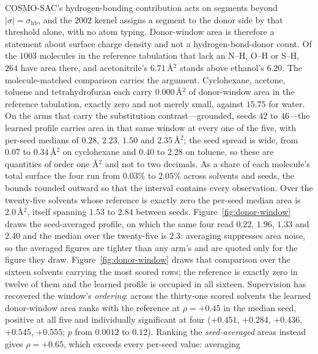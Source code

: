 COSMO-SAC's hydrogen-bonding contribution acts on segments beyond $|\sigma|=\sigma_{\mathrm{hb}}$,
and the $2002$ kernel assigns a segment to the donor side by that threshold alone, with no atom
typing. Donor-window area is therefore a statement about surface charge density and not a
hydrogen-bond-donor count. Of the $1003$ molecules in the reference tabulation that lack an N--H,
O--H or S--H, $264$ have area there, and acetonitrile's $6.71$\,\AA$^2$ stands above ethanol's
$6.20$. The molecule-matched comparison carries the argument. Cyclohexane, acetone, toluene and
tetrahydrofuran each carry $0.000$\,\AA$^2$ of donor-window area in the reference tabulation,
exactly zero and not merely small, against $15.75$ for water. On the arms that carry the
substitution contrast---grounded, seeds $42$ to $46$---the learned profile carries area in that same
window at every one of the five, with per-seed medians of $0.28$, $2.23$, $1.50$ and
$2.35$\,\AA$^2$; the seed spread is wide, from $0.07$ to $0.34$\,\AA$^2$ on cyclohexane and $0.40$
to $2.28$ on toluene, so these are quantities of order one \AA$^2$ and not to two decimals. As a
share of each molecule's total surface the four run from $0.03\%$ to $2.05\%$ across solvents and
seeds, the bounds rounded outward so that the interval contains every observation. Over the twenty-five solvents whose reference is exactly zero the per-seed median area is
$2.0$\,\AA$^2$, itself spanning $1.53$ to $2.84$ between seeds. Figure~\ref{fig:donor-window} draws
the seed-averaged profile, on which the same four read $0.22$, $1.96$, $1.33$ and $2.40$ and the
median over the twenty-five is $2.3$: averaging suppresses area noise, so the averaged figures are
tighter than any arm's and are quoted only for the figure they draw. Figure~\ref{fig:donor-window} draws that comparison over the sixteen solvents
carrying the most scored rows; the reference is exactly zero in twelve of them and the learned
profile is occupied in all sixteen. Supervision has recovered the window's \emph{ordering}: across
the thirty-one scored solvents the learned donor-window area ranks with the reference at
$\rho=+0.45$ in the median seed, positive at all five and individually significant at four
($+0.451$, $+0.284$, $+0.436$, $+0.545$, $+0.555$; $p$ from $0.0012$ to $0.12$). Ranking the
\emph{seed-averaged} areas instead gives $\rho=+0.65$, which exceeds every per-seed value: averaging
